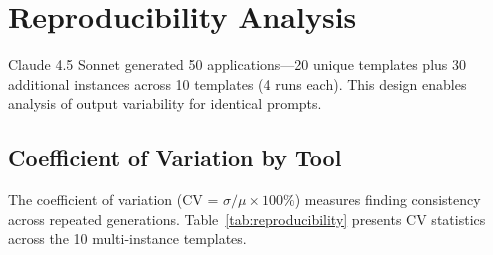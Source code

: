 \section{Reproducibility Analysis}
\label{sec:reproducibility}

Claude 4.5 Sonnet generated 50 applications---20 unique templates plus 30 additional instances across 10 templates (4 runs each). This design enables analysis of output variability for identical prompts.

\subsection{Coefficient of Variation by Tool}

The coefficient of variation (CV = $\sigma / \mu \times 100\%$) measures finding consistency across repeated generations. Table~\ref{tab:reproducibility} presents CV statistics across the 10 multi-instance templates.

